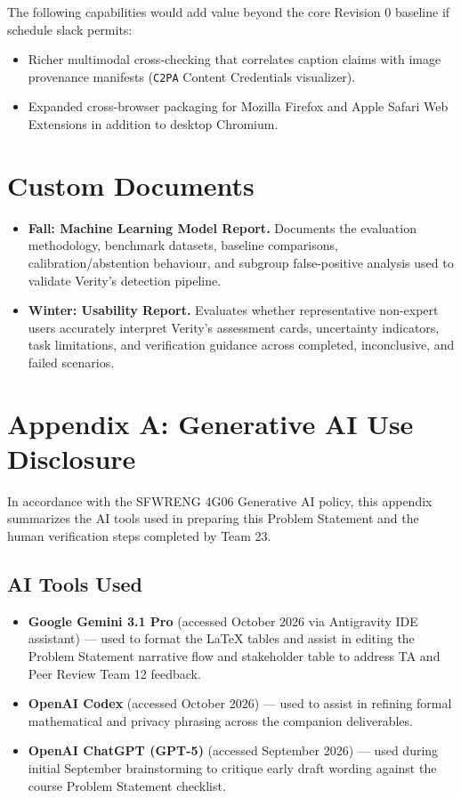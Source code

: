 \documentclass[11pt]{article}
\begin{document}
The following capabilities would add value beyond the core Revision 0 baseline if schedule slack permits:
\begin{itemize}[leftmargin=*]
    \item Richer multimodal cross-checking that correlates caption claims with image provenance manifests (\texttt{C2PA} Content Credentials visualizer).
    \item Expanded cross-browser packaging for Mozilla Firefox and Apple Safari Web Extensions in addition to desktop Chromium.
\end{itemize}

\section{Custom Documents}

\begin{itemize}[leftmargin=*]
    \item \textbf{Fall: Machine Learning Model Report.} Documents the evaluation methodology, benchmark datasets, baseline comparisons, calibration/abstention behaviour, and subgroup false-positive analysis used to validate Verity's detection pipeline.
    \item \textbf{Winter: Usability Report.} Evaluates whether representative non-expert users accurately interpret Verity's assessment cards, uncertainty indicators, task limitations, and verification guidance across completed, inconclusive, and failed scenarios.
\end{itemize}

\newpage
\section*{Appendix A: Generative AI Use Disclosure}

In accordance with the SFWRENG 4G06 Generative AI policy, this appendix summarizes the AI tools used in preparing this Problem Statement and the human verification steps completed by Team 23.

\subsection*{AI Tools Used}
\begin{itemize}[leftmargin=*]
    \item \textbf{Google Gemini 3.1 Pro} (accessed October 2026 via Antigravity IDE assistant) --- used to format the \LaTeX{} tables and assist in editing the Problem Statement narrative flow and stakeholder table to address TA and Peer Review Team 12 feedback.
    \item \textbf{OpenAI Codex} (accessed October 2026) --- used to assist in refining formal mathematical and privacy phrasing across the companion deliverables.
    \item \textbf{OpenAI ChatGPT (GPT-5)} (accessed September 2026) --- used during initial September brainstorming to critique early draft wording against the course Problem Statement checklist.
\end{itemize}
\end{document}
